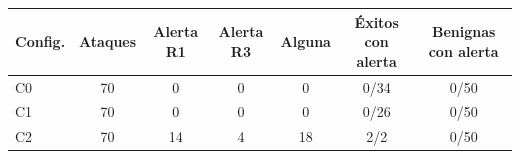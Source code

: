\begin{tabular}{lcccccc}
\toprule
Config. & Ataques & Alerta R1 & Alerta R3 & Alguna & Éxitos con alerta & Benignas con alerta \\
\midrule
C0 & 70 & 0 & 0 & 0 & 0/34 & 0/50 \\
C1 & 70 & 0 & 0 & 0 & 0/26 & 0/50 \\
C2 & 70 & 14 & 4 & 18 & 2/2 & 0/50 \\
\bottomrule
\end{tabular}
